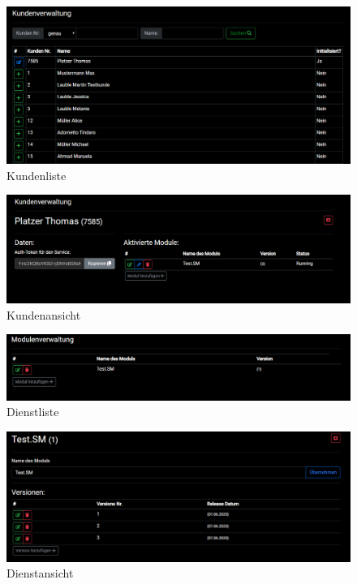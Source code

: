 \begin{center}
    \begin{figure}[H]
        \centering
        \includegraphics[scale=0.4]{content/attachments/s-cus-list.png}
        \caption{Kundenliste}
        \label{fig:s_cus_list}
    \end{figure}
    
    \begin{figure}[H]
        \centering
        \includegraphics[scale=0.4]{content/attachments/s-cus-view.png}
        \caption{Kundenansicht}
        \label{fig:s_cus_view}
    \end{figure}
    
    \begin{figure}[H]
        \centering
        \includegraphics[scale=0.4]{content/attachments/s-ser-list.png}
        \caption{Dienstliste}
        \label{fig:s_ser_list}
    \end{figure}
    
    \begin{figure}[H]
        \centering
        \includegraphics[scale=0.4]{content/attachments/s-ser-view.png}
        \caption{Dienstansicht}
        \label{fig:s_ser_view}
    \end{figure}
    

\end{center}
